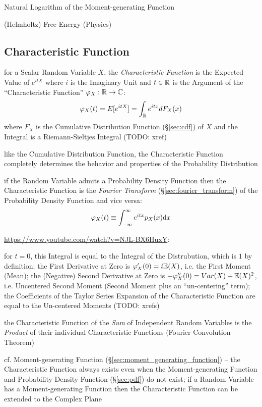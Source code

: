 Natural Logarithm of the Moment-generating Function

(Helmholtz) Free Energy (Physics)



\subsection{Characteristic Function}\label{sec:characteristic_function}

for a Scalar Random Variable $X$, the \emph{Characteristic Function} is the
Expected Value of $e^{itX}$ where $i$ is the Imaginary Unit and $t \in \mathbb{R}$
is the Argument of the ``Characteristic Function''
$\varphi_X : \mathbb{R} \to \mathbb{C}$:
\[
  \varphi_X(t) = E[e^{itX}] = \int_{\mathbb{R}} e^{itx} dF_X(x)
\]
where $F_X$ is the Cumulative Distribution Function (\S\ref{sec:cdf}) of $X$ and
the Integral is a Riemann-Sieltjes Integral (TODO: xref)

like the Cumulative Distribution Function, the Characteristic Function
completely determines the behavior and properties of the Probability
Distribution

if the Random Variable admits a Probability Density Function then the
Characteristic Function is the \emph{Fourier Transform}
(\S\ref{sec:fourier_transform}) of the Probability Density Function and vice
versa:
\[
  \varphi_X(t) \equiv \int_{-\infty}^\infty e^{itx} p_X(x) \mathrm{d}x
\]

\url{https://www.youtube.com/watch?v=NJL-BX6HuxY}:

for $t = 0$, this Integral is equal to the Integral of the Distrubution, which
is $1$ by definition; the First Derivative at Zero is
$\varphi'_X(0) = i \mathbb{E}(X)$, i.e. the First Moment (Mean); the (Negative)
Second Derivative at Zero is $-\varphi''_X(0) = Var(X) + \mathbb{E}(X)^2$, i.e.
Uncentered Second Moment (Second Moment plus an ``un-centering'' term); the
Coefficients of the Taylor Series Expansion of the Characteristic Function are
equal to the Un-centered Moments (TODO: xrefs)

the Characteristic Function of the \emph{Sum} of Independent Random Variables is
the \emph{Product} of their individual Characteristic Functions (Fourier
Convolution Theorem)

cf. Moment-generating Function (\S\ref{sec:moment_generating_function}) --
the Characteristic Function always exists even when the Moment-generating
Function and Probability Density Function (\S\ref{sec:pdf}) do not exist;
if a Random Variable has a Moment-generating Function then the Characteristic
Function can be extended to the Complex Plane

